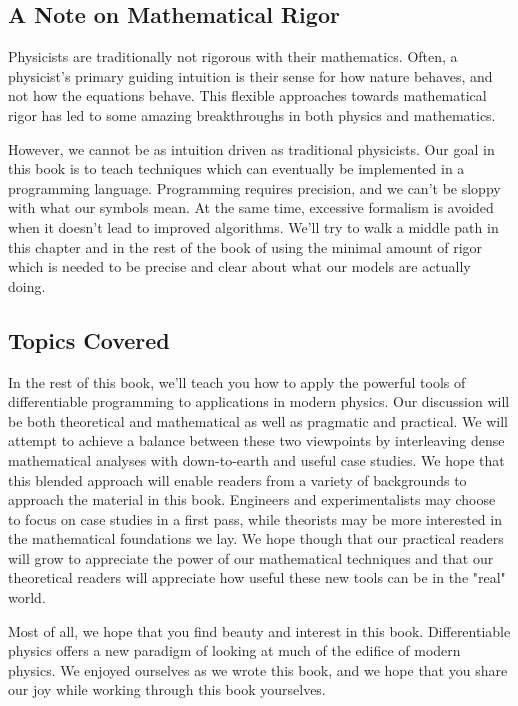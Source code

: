 \documentclass[book.tex]{subfiles}
\begin{document}
\subsection{A Note on Mathematical Rigor}

Physicists are traditionally not rigorous with their mathematics. Often, a physicist's primary guiding intuition is their sense for how nature behaves, and not how the equations behave. This flexible approaches towards mathematical rigor has led to some amazing breakthroughs in both physics and mathematics.

However, we cannot be as intuition driven as traditional physicists. Our goal in this book is to teach techniques which can eventually be implemented in a programming language. Programming requires precision, and we can't be sloppy with what our symbols mean. At the same time, excessive formalism is avoided when it doesn't lead to improved algorithms. We'll try to walk a middle path in this chapter and in the rest of the book of using the minimal amount of rigor which is needed to be precise and clear about what our models are actually doing.

\subsection{Topics Covered}

In the rest of this book, we'll teach you how to apply the powerful tools of differentiable programming to applications in modern physics. Our discussion will be both theoretical and mathematical as well as pragmatic and practical. We will attempt to achieve a balance between these two viewpoints by interleaving dense mathematical analyses with down-to-earth and useful case studies. We hope that this blended approach will enable readers from a variety of backgrounds to approach the material in this book. Engineers and experimentalists may choose to focus on case studies in a first pass, while theorists may be more interested in the mathematical foundations we lay. We hope though that our practical readers will grow to appreciate the power of our mathematical techniques and that our theoretical readers will appreciate how useful these new tools can be in the "real" world.

Most of all, we hope that you find beauty and interest in this book. Differentiable physics offers a new paradigm of looking at much of the edifice of modern physics. We enjoyed ourselves as we wrote this book, and we hope that you share our joy while working through this book yourselves.
\end{document}
